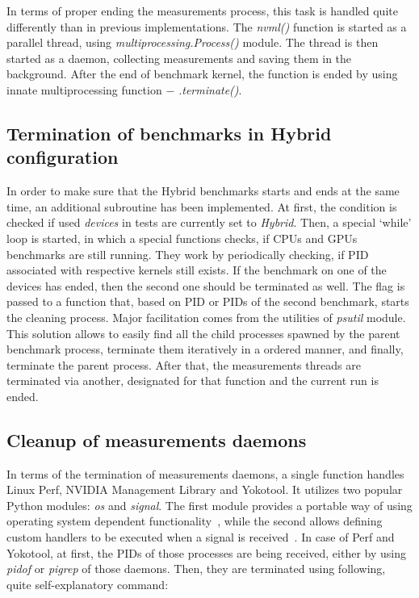 In terms of proper ending the measurements process, this task is handled quite
differently than in previous implementations. The \emph{nvml\@()} function is
started as a parallel thread, using \emph{multiprocessing.Process\@()} module.
The thread is then started as a daemon, collecting measurements and saving
them in the background. After the end of benchmark kernel, the function is
ended by using innate multiprocessing function $-$ \emph{.terminate\@()}.

\newpage

\subsection{Termination of benchmarks in Hybrid configuration}

In order to make sure that the Hybrid benchmarks starts and ends at the same
time, an additional subroutine has been implemented. At first, the condition
is checked if used \emph{devices} in tests are currently set to \emph{Hybrid}.
Then, a special `while' loop is started, in which a special functions checks,
if CPUs and GPUs benchmarks are still running. They work by periodically
checking, if PID associated with respective kernels still exists. If the 
benchmark on one of the devices has ended, then the second one should be
terminated as well. The flag is passed to a function that, based on PID or
PIDs of the second benchmark, starts the cleaning process. Major facilitation
comes from the utilities of \emph{psutil} module. This solution allows to
easily find all the child processes spawned by the parent benchmark process,
terminate them iteratively in a ordered manner, and finally, terminate the
parent process. After that, the measurements threads are terminated via
another, designated for that function and the current run is ended.

\subsection{Cleanup of measurements daemons}

In terms of the termination of measurements daemons, a single function
handles Linux Perf, NVIDIA Management Library and Yokotool. It utilizes two
popular Python modules: \emph{os} and \emph{signal}. The first module provides
a portable way of using operating system dependent
functionality~\cite{Python_os_module}, while the second allows defining custom
handlers to be executed when a signal is received~\cite{Python_signal_module}.
In case of Perf and Yokotool, at first, the PIDs of those processes are being
received, either by using \emph{pidof} or \emph{pigrep} of those daemons.
Then, they are terminated using following, quite self-explanatory command:

